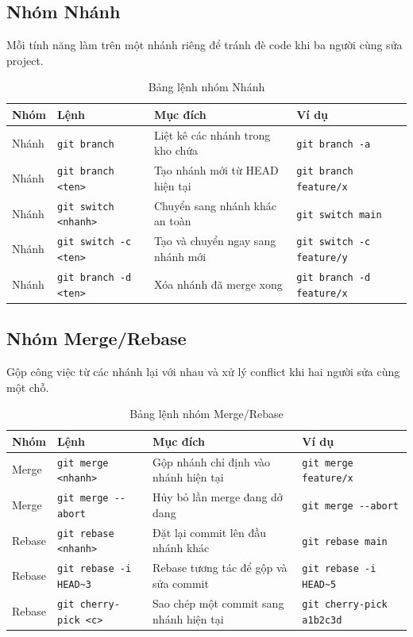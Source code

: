 \subsection{Nhóm Nhánh}
Mỗi tính năng làm trên một nhánh riêng để tránh đè code khi ba người cùng sửa project.
\begin{table}[H]
\centering
\small
\begin{tabular}{p{1.7cm} p{3.2cm} p{4.5cm} p{4.6cm}}
\toprule
Nhóm & Lệnh & Mục đích & Ví dụ \\
\midrule
Nhánh & \verb|git branch| & Liệt kê các nhánh trong kho chứa & \verb|git branch -a| \\
Nhánh & \verb|git branch <ten>| & Tạo nhánh mới từ HEAD hiện tại & \verb|git branch feature/x| \\
Nhánh & \verb|git switch <nhanh>| & Chuyển sang nhánh khác an toàn & \verb|git switch main| \\
Nhánh & \verb|git switch -c <ten>| & Tạo và chuyển ngay sang nhánh mới & \verb|git switch -c feature/y| \\
Nhánh & \verb|git branch -d <ten>| & Xóa nhánh đã merge xong & \verb|git branch -d feature/x| \\
\bottomrule
\end{tabular}
\caption{Bảng lệnh nhóm Nhánh}
\label{tab:pa-nhanh}
\end{table}

\subsection{Nhóm Merge/Rebase}
Gộp công việc từ các nhánh lại với nhau và xử lý conflict khi hai người sửa cùng một chỗ.
\begin{table}[H]
\centering
\small
\begin{tabular}{p{1.7cm} p{3.2cm} p{4.5cm} p{4.6cm}}
\toprule
Nhóm & Lệnh & Mục đích & Ví dụ \\
\midrule
Merge & \verb|git merge <nhanh>| & Gộp nhánh chỉ định vào nhánh hiện tại & \verb|git merge feature/x| \\
Merge & \verb|git merge --abort| & Hủy bỏ lần merge đang dở dang & \verb|git merge --abort| \\
Rebase & \verb|git rebase <nhanh>| & Đặt lại commit lên đầu nhánh khác & \verb|git rebase main| \\
Rebase & \verb|git rebase -i HEAD~3| & Rebase tương tác để gộp và sửa commit & \verb|git rebase -i HEAD~5| \\
Rebase & \verb|git cherry-pick <c>| & Sao chép một commit sang nhánh hiện tại & \verb|git cherry-pick a1b2c3d| \\
\bottomrule
\end{tabular}
\caption{Bảng lệnh nhóm Merge/Rebase}
\label{tab:pa-merge}
\end{table}

